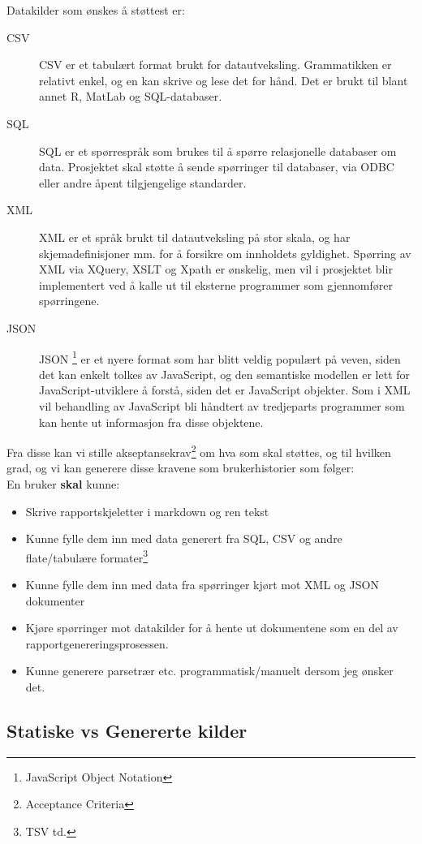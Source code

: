 Datakilder som ønskes å støttest er:
\begin{description}
\item [CSV]
  CSV er et tabulært format brukt for datautveksling. Grammatikken er relativt enkel, og en kan skrive og lese det for hånd.
  Det er brukt til blant annet R, MatLab og SQL-databaser.
\item [SQL]
  SQL er et spørrespråk som brukes til å spørre relasjonelle databaser om data.
  Prosjektet skal støtte å sende spørringer til databaser,
  via ODBC eller andre åpent tilgjengelige standarder.
\item [XML]
  XML er et språk brukt til datautveksling på stor skala, og har skjemadefinisjoner mm. for å forsikre om innholdets gyldighet.
  Spørring av XML via XQuery, XSLT og Xpath er ønskelig, men vil i prosjektet blir implementert ved å kalle ut til eksterne programmer som gjennomfører spørringene.
\item [JSON]
  JSON \footnote{JavaScript Object Notation} er et nyere format som har blitt veldig populært på veven, siden det kan enkelt tolkes av JavaScript, og den semantiske modellen er lett for JavaScript-utviklere å forstå, siden det er JavaScript objekter.
  Som i XML vil behandling av JavaScript bli håndtert av tredjeparts programmer som kan hente ut informasjon fra disse objektene.
\end{description}

Fra disse kan vi stille akseptansekrav\footnote{Acceptance Criteria} om hva som skal støttes, og til hvilken grad, og vi kan generere disse kravene som brukerhistorier som følger:\\
En bruker \textbf{skal} kunne:
\begin{itemize}
\item Skrive rapportskjeletter i markdown og ren tekst
\item Kunne fylle dem inn med data generert fra SQL, CSV og andre flate/tabulære formater\footnote{TSV td.}
\item Kunne fylle dem inn med data fra spørringer kjørt mot XML og JSON dokumenter
\item Kjøre spørringer mot datakilder for å hente ut dokumentene som en del av rapportgenereringsprosessen.
\item Kunne generere parsetrær etc. programmatisk/manuelt dersom jeg ønsker det.
\end{itemize}

\subsection{Statiske vs Genererte kilder}
\label{subsec:evaluering-statisk-vs-generert}

